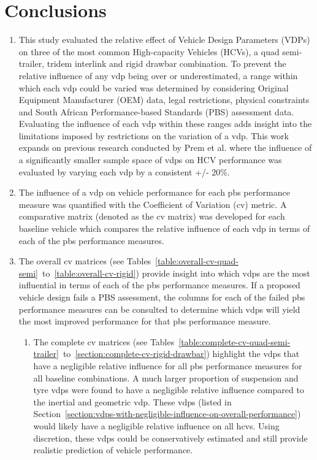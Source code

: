 \chapter{Conclusions}\label{Conclusions} 

\begin{enumerate}\addtolength{\itemsep}{0.5\baselineskip}

\item This study evaluated the relative effect of Vehicle Design Parameters (VDPs) on three of the most common High-capacity Vehicles (HCVs), a quad semi-trailer, tridem interlink and rigid drawbar combination. To prevent the relative influence of any \gls{vdp} being over or underestimated, a range within which each \gls{vdp} could be varied was determined by considering Original Equipment Manufacturer (OEM) data, legal restrictions, physical constraints and South African Performance-based Standards (PBS) assessment data. Evaluating the influence of each \gls{vdp} within these ranges adds insight into the limitations imposed by restrictions on the variation of a \gls{vdp}. This work expands on previous research conducted by Prem et al. \cite{Prem2002} where the influence of a significantly smaller sample space of \glspl{vdp} on HCV performance was evaluated by varying each \gls{vdp} by a consistent +/- 20\%.

\item The influence of a \gls{vdp} on vehicle performance for each \gls{pbs} performance measure was quantified with the Coefficient of Variation (\gls{cv}) metric. A comparative matrix (denoted as the \gls{cv} matrix) was developed for each baseline vehicle which compares the relative influence of each \gls{vdp} in terms of each of the \gls{pbs} performance measures. 

\item The overall \gls{cv} matrices (see Tables~\ref{table:overall-cv-quad-semi}~to~\ref{table:overall-cv-rigid}) provide insight into which \glspl{vdp} are the most influential in terms of each of the \gls{pbs} performance measures. If a proposed vehicle design fails a PBS assessment, the columns for each of the failed \gls{pbs} performance measures can be consulted to determine which \glspl{vdp} will yield the most improved performance for that \gls{pbs} performance measure.

\begin{enumerate}
\item The complete \gls{cv} matrices (see Tables~\ref{table:complete-cv-quad-semi-trailer}~to~\ref{section:complete-cv-rigid-drawbar}) highlight the \glspl{vdp} that have a negligible relative influence for all \gls{pbs} performance measures for all baseline combinations. A much larger proportion of suspension and tyre \glspl{vdp} were found to have a negligible relative influence compared to the inertial and geometric \gls{vdp}. These \glspl{vdp} (listed in Section~\ref{section:vdps-with-negligible-influence-on-overall-performance}) would likely have a negligible relative influence on all \glspl{hcv}. Using discretion, these \glspl{vdp} could be conservatively estimated and still provide realistic prediction of vehicle performance.


\end{enumerate}
\end{enumerate}
